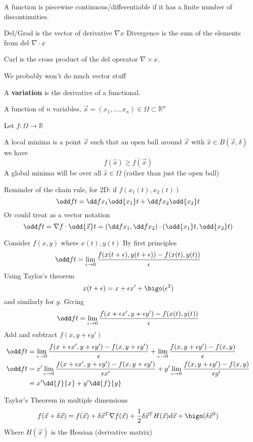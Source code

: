 \documentclass{E:/Documents/Latex/myassignment}
\begin{document}
A function is piecewise continuous/differentiable if it has a finite number of discontinuities.

Del/Grad is the vector of derivative $\nabla x$
Divergence is the sum of the elements from del $\nabla \cdot x$

Curl is the cross product of the del operator $\nabla \times x$.

We probably won't do much vector stuff



A \textbf{variation} is the derivative of a functional.

A function of $n$ variables, $\vec x = (x_1,\ldots,x_n) \in \Omega \subset \mathbb{R}^n$ 

Let $f : \Omega \to \mathbb{R}$

A local minima is a point $\vec x$ such that an open ball around $\vec x$ with $\hat{x} \in B(\vec x,\delta)$ we have
\[f(\hat{x}) \geq f(\vec x)\]
A global minima will be over all $\hat{x} \in \Omega$ (rather than just the open ball)


Reminder of the chain rule, for 2D: if $f(x_1(t),x_2(t))$
\[\odd ft = \dd f{x_1} \odd{x_1}t + \dd f{x_2} \odd{x_2}t\]
Or could treat as a vector notation
\[\odd ft = \nabla f \cdot \odd{\vec x}t = \left(\dd f{x_1}, \dd f{x_2} \right) \cdot \left(\odd{x_1}t, \odd{x_2}t\right)\]

Consider $f(x,y)$ where $x(t),y(t)$ 
By first principles
\[\odd ft = \lim_{\epsilon\to 0} \frac{f(x(t+\epsilon),y(t+\epsilon)) - f(x(t),y(t))}{\epsilon}\]
Using Taylor's theorem
\[x(t+\epsilon) = x + \epsilon x' + \bigo(\epsilon^2)\]
and similarly for $y$.
Giving
\[\odd ft = \lim_{\epsilon\to 0} \frac{f(x + \epsilon x',y + \epsilon y') - f(x(t),y(t))}{\epsilon}\]
Add and subtract $f(x,y+\epsilon y')$ 
\begin{align*}
	\odd ft &= \lim_{\epsilon\to 0} \frac{f(x + \epsilon x',y + \epsilon y') - f(x,y+\epsilon y')}{\epsilon} + \lim_{\epsilon\to 0} \frac{f(x,y+\epsilon y') - f(x,y)}{\epsilon}\\
	\odd ft &= x'\lim_{\epsilon\to 0} \frac{f(x + \epsilon x',y + \epsilon y') - f(x,y+\epsilon y')}{\epsilon x'} + y'\lim_{\epsilon\to 0} \frac{f(x,y+\epsilon y') - f(x,y)}{\epsilon y'}\\
	&= x' \dd{f}{x} + y' \dd{f}{y}
\end{align*}

Taylor's Theorem in multiple dimensions
\[f(\vec x + \delta \vec x) = f(\vec x) + \delta \vec x^T\nabla f(\vec x) + \frac12 \delta \vec x^T H(\vec x) d \vec x + \bigo(\delta \vec x^3)\]
Where $H(\vec x)$ is the Hessian (derivative matrix)
\end{document}
